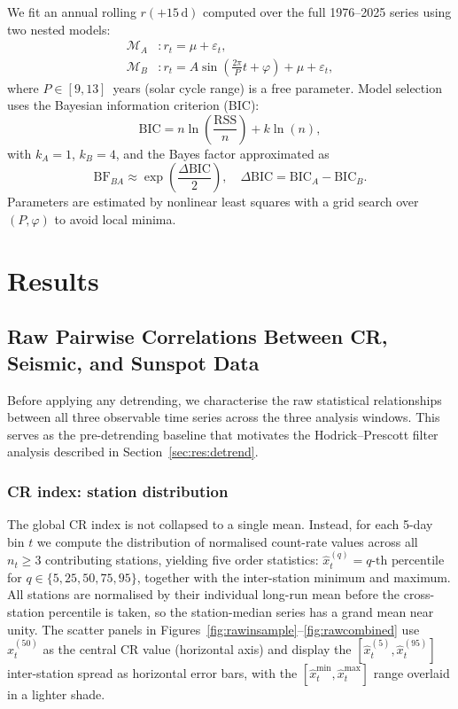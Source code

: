 \documentclass[12pt,a4paper]{article}
\begin{document}
We fit an annual rolling $r(+15\,\text{d})$ computed over the full 1976--2025
series using two nested models:
\begin{align}
  \mathcal{M}_A &: r_t = \mu + \varepsilon_t, \label{eq:modA}\\
  \mathcal{M}_B &: r_t = A \sin\!\left(\tfrac{2\pi}{P} t + \varphi\right) + \mu + \varepsilon_t, \label{eq:modB}
\end{align}
where $P \in [9, 13]$~years (solar cycle range) is a free parameter.
Model selection uses the Bayesian information criterion (BIC):
\begin{equation}
  \text{BIC} = n \ln\!\left(\frac{\text{RSS}}{n}\right) + k \ln(n),
  \label{eq:bic}
\end{equation}
with $k_A = 1$, $k_B = 4$, and the Bayes factor approximated as
\begin{equation}
  \text{BF}_{BA} \approx \exp\!\left(\frac{\Delta\text{BIC}}{2}\right),
  \quad \Delta\text{BIC} = \text{BIC}_A - \text{BIC}_B.
  \label{eq:bf}
\end{equation}
Parameters are estimated by nonlinear least squares with a grid search over
$(P, \varphi)$ to avoid local minima.

\section{Results}
\label{sec:results}

\subsection{Raw Pairwise Correlations Between CR, Seismic, and Sunspot Data}
\label{sec:res:rawcorr}

Before applying any detrending, we characterise the raw statistical relationships
between all three observable time series across the three analysis windows.
This serves as the pre-detrending baseline that motivates the Hodrick--Prescott
filter analysis described in Section~\ref{sec:res:detrend}.

\subsubsection{CR index: station distribution}

The global CR index is not collapsed to a single mean.
Instead, for each 5-day bin $t$ we compute the distribution of normalised
count-rate values across all $n_t \geq 3$ contributing stations,
yielding five order statistics:
$\hat{x}_{t}^{(q)} = q\text{-th percentile}$ for $q \in \{5, 25, 50, 75, 95\}$,
together with the inter-station minimum and maximum.
All stations are normalised by their individual long-run mean before the
cross-station percentile is taken, so the station-median series has a grand
mean near unity.
The scatter panels in Figures~\ref{fig:rawinsample}--\ref{fig:rawcombined}
use $\hat{x}_{t}^{(50)}$ as the central CR value (horizontal axis) and display
the $[\hat{x}_{t}^{(5)}, \hat{x}_{t}^{(95)}]$ inter-station spread as
horizontal error bars, with the $[\hat{x}_{t}^{\min}, \hat{x}_{t}^{\max}]$
range overlaid in a lighter shade.
\end{document}
